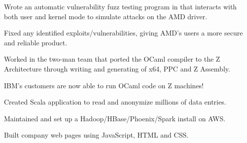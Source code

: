 \documentclass[letterpaper]{deedy-resume-modified} %
\begin{document}
\begin{minipage}[t]{0.70\textwidth}
\sectionspace %



\vspace{\topsep}
\begin{tightitemize}
\vspace{-10pt}
\item Wrote an automatic vulnerability fuzz testing program in \CPP \hspace{1pt} that interacts with both user and kernel mode to simulate attacks on the AMD driver.  
\item Fixed any identified exploits/vulnerabilities, giving AMD's users a more secure and reliable product.
\end{tightitemize}

\sectionspace %



\begin{tightitemize}
\item Worked in the two-man team that ported the OCaml compiler to the Z Architecture through writing and generating of x64, PPC and Z Assembly.
\item IBM's customers are now able to run OCaml code on Z machines!
\end{tightitemize}

\sectionspace %



\begin{tightitemize}
\item Created Scala application to read and anonymize millions of data entries.
\item Maintained and set up a Hadoop/HBase/Phoenix/Spark install on AWS.
\item Built company web pages using JavaScript, HTML and CSS.
\end{tightitemize}

\sectionspace %


\end{minipage}
\end{document}
